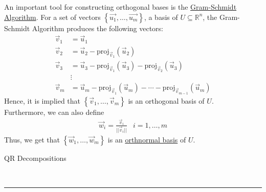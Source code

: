 \documentclass{article}
\newcommand{\header}[1]{\begin{large}\noindent #1\end{large}\\\rule{\textwidth}{0.5pt}}
\newcommand{\gap}{\medskip\\}
\newcommand{\curly}[1]{\left\{#1\right\}}
\newcommand{\proj}[2]{{}\textrm{proj}_{#1}\left(#2\right)}}
\begin{document}
An important tool for constructing orthogonal bases is the 
\underline{Gram-Schmidt Algorithm}. For a set of vectors $\curly{\vec{u_1}, \ldots, \vec{u_m}}$,
a basis of $U \subseteq \mathbb{R}^n$, the Gram-Schmidt Algorithm produces
the following vectors:
\begin{align*}
    \vec{v}_1 &= \vec{u}_1\\
    \vec{v}_2 &= \vec{u}_2 - \proj{\vec{v}_1}{\vec{u}_2}\\
    \vec{v}_3 &= \vec{u}_3 - \proj{\vec{v}_1}{\vec{u}_3} - \proj{\vec{v}_2}{\vec{u}_3}\\
    &\vdots\\
    \vec{v}_m &= \vec{u}_m - \proj{\vec{v}_1}{\vec{u}_m} - \cdots - \proj{\vec{v}_{m - 1}}{\vec{u}_m}
\end{align*}
Hence, it is implied that $\curly{\vec{v}_1, \ldots, \vec{v}_m}$
is an orthogonal basis of $U$.
\gap
Furthermore, we can also define
\begin{align*}
    \vec{w}_i = \frac{\vec{v}_i}{||\vec{v}_i||} & i = 1, \ldots, m
\end{align*}
Thus, we get that $\curly{\vec{w}_1 , \ldots, \vec{w}_m}$ is an 
\underline{orthnormal basis} of $U$.

\pagebreak

\header{QR Decompositions}
\end{document}
